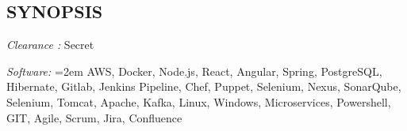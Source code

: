 \documentclass[12pt, line, margin]{res}
\begin{document}

\address{
}

\begin{resume}


\section{SYNOPSIS} {\sl Clearance :} Secret

               {\sl Software:}  
			\hangindent=2em
			AWS, Docker, Node.js, React, Angular, Spring, PostgreSQL,\newline 
			Hibernate, Gitlab, Jenkins Pipeline, Chef, Puppet, Selenium, Nexus,\newline
			SonarQube, Selenium, Tomcat, Apache, Kafka, Linux, Windows,\newline
			Microservices, Powershell, GIT, Agile, Scrum, Jira, Confluence\newline


\end{resume}
\end{document}
